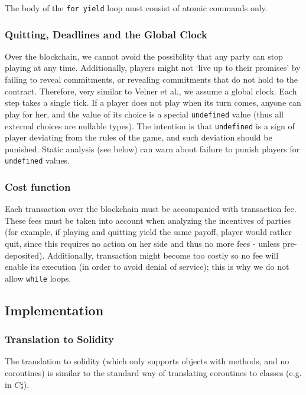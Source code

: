 \documentclass[acmsmall,review,anonymous]{acmart}\settopmatter{printfolios=true,printccs=false,printacmref=false}
\begin{document}
The body of the \texttt{for yield} loop must consist of atomic commands only.

\subsubsection{Quitting, Deadlines and the Global Clock}
Over the blockchain, we cannot avoid the possibility that any party can stop playing at any time. Additionally, players might not `live up to their promises' by failing to reveal commitments, or revealing commitments that do not hold to the contract.
Therefore, very similar to Velner et al., we assume a global clock. Each step takes a single tick. If a player does not play when its turn comes, anyone can play for her, and the value of its choice is a special \texttt{undefined} value (thus all external choices are nullable types). The intention is that \texttt{undefined} is a sign of player deviating from the rules of the game, and such deviation should be punished. Static analysis (see below) can warn about failure to punish players for \texttt{undefined} values.

\subsubsection{Cost function}
Each transaction over the blockchain must be accompanied with transaction fee. These fees must be taken into account when analyzing the incentives of parties (for example, if playing and quitting yield the same payoff, player would rather quit, since this requires no action on her side and thus no more fees - unless pre-deposited). Additionally, transaction might become too costly so no fee will enable its execution (in order to avoid denial of service); this is why we do not allow \texttt{while} loops.

\subsection{Implementation}
\subsubsection{Translation to Solidity}
The translation to solidity (which only supports objects with methods, and no coroutines) is similar to the standard way of translating coroutines to classes (e.g. in $C\sharp$).
\end{document}
